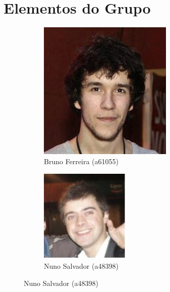 \documentclass[11pt, a4paper, twoside]{article}
\begin{document}
\newpage
\section{Elementos do Grupo}

\begin{figure}[h!]
\centering
\begin{subfigure}{.5\textwidth}
  \centering
  \includegraphics[width=0.8\linewidth]{brunoferreira}
  \caption{Bruno Ferreira (a61055)}
\end{subfigure}%
\begin{subfigure}{.5\textwidth}
  \centering
  \includegraphics[width=0.8\linewidth]{nunosalvador}
  \caption{Nuno Salvador (a48398)}
\end{subfigure}%
\end{figure}
\end{document}
